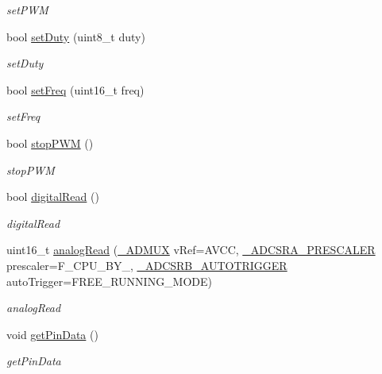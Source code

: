 \begin{DoxyCompactItemize}
\begin{DoxyCompactList}\small\item\em set\+P\+WM \end{DoxyCompactList}\item 
bool \hyperlink{classPin_a938a229474b8319ced9edbad488d6157}{set\+Duty} (uint8\+\_\+t duty)
\begin{DoxyCompactList}\small\item\em set\+Duty \end{DoxyCompactList}\item 
bool \hyperlink{classPin_a8610548d2ab0b531e4e0697ca09aeb0c}{set\+Freq} (uint16\+\_\+t freq)
\begin{DoxyCompactList}\small\item\em set\+Freq \end{DoxyCompactList}\item 
bool \hyperlink{classPin_a4ea18c4f3780b3af59406be5d0b5a176}{stop\+P\+WM} ()
\begin{DoxyCompactList}\small\item\em stop\+P\+WM \end{DoxyCompactList}\item 
bool \hyperlink{classPin_ae04006b8dc5d6fb25ff4e2a781ba047d}{digital\+Read} ()
\begin{DoxyCompactList}\small\item\em digital\+Read \end{DoxyCompactList}\item 
uint16\+\_\+t \hyperlink{classPin_ac678e5fd7f7bc33260eb909178e17367}{analog\+Read} (\hyperlink{portmanager_8h_a8d9d23dfe13306b19ea34849030170c0}{\+\_\+\+A\+D\+M\+UX} v\+Ref=A\+V\+CC, \hyperlink{portmanager_8h_a5592d933b0785ca2835e48fa1ddeb09c}{\+\_\+\+A\+D\+C\+S\+R\+A\+\_\+\+P\+R\+E\+S\+C\+A\+L\+ER} prescaler=F\+\_\+\+C\+P\+U\+\_\+\+B\+Y\+\_, \hyperlink{portmanager_8h_aa8e8b629c972eb4ba66a0e092953f81d}{\+\_\+\+A\+D\+C\+S\+R\+B\+\_\+\+A\+U\+T\+O\+T\+R\+I\+G\+G\+ER} auto\+Trigger=F\+R\+E\+E\+\_\+\+R\+U\+N\+N\+I\+N\+G\+\_\+\+M\+O\+DE)
\begin{DoxyCompactList}\small\item\em analog\+Read \end{DoxyCompactList}\item 
\mbox{\label{classPin_aa81249603376710b26f6e803db46658e}} 
void \hyperlink{classPin_aa81249603376710b26f6e803db46658e}{get\+Pin\+Data} ()
\begin{DoxyCompactList}\small\item\em get\+Pin\+Data \end{DoxyCompactList}\item 

\end{DoxyCompactItemize}
